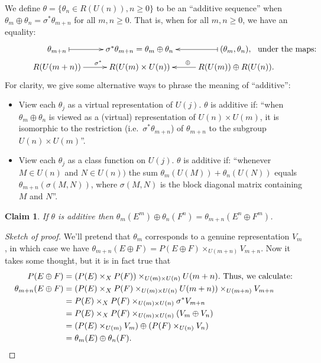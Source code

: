 \documentclass{article}
\newcommand{\from}{\leftarrow}
\newtheorem{claim}[thm]{Claim}
\begin{document}
We define $\theta = \{\theta_n \in R(U(n)), n \ge 0\}$ to be an ``additive sequence'' when $\theta_m \oplus \theta_n = \sigma^* \theta_{m+n}$ for all $m, n \ge 0$. That is, when for all $m,n\geq0$, we have an equality:
\[\xymatrix@R=2mm{
\theta_{m+n}\ar@{|->}[r]& \sigma^*\theta_{m+n}=\theta_m\oplus\theta_n&\ar@{|->}[l]
(\theta_m,\theta_n), \makebox[0mm][l]{\textup{ \ under the maps:} }\\
R(U(m+n)) \ar[r]^{\sigma^*}& R(U(m) \times U(n))&R(U(m))\oplus R(U(n))\ar[l]_\oplus .
}\]
For clarity, we give some alternative ways to phrase the meaning of ``additive'':
\begin{itemize}
\item View each $\theta_j$ as a virtual representation of $U(j)$. $\theta$ is additive if: ``when $\theta_m\oplus\theta_n$ is viewed as a (virtual) representation of $U(n)\times U(m)$, it is isomorphic to the restriction (i.e.\ $\sigma^*\theta_{m+n}$) of $\theta_{m+n}$ to the subgroup $U(n)\times U(m)$''.
\item View each $\theta_j$ as a class function on $U(j)$. $\theta$ is additive if: ``whenever $M\in U(n)$ and $N\in U(n))$ the sum $\theta_m(U(M))+\theta_n(U(N))$ equals $\theta_{m+n}(\sigma(M,N))$, where $\sigma(M,N)$ is the block diagonal matrix containing $M$ and $N$''.
\end{itemize}
\begin{claim}
If $\theta$ is additive then $\theta_m (E^m) \oplus \theta_n (F^n) = \theta_{m+n}(E^n \oplus F^m)$.
\end{claim}
\begin{proof}[Sketch of proof]
We'll pretend that $\theta_m$ corresponds to a genuine representation $V_m$, in which case we have $\theta_{m+n}(E \oplus F) = P(E \oplus F) \times_{U(m+n)} V_{m+n}$.  Now it takes some thought, but it is in fact true that
\begin{align*}
P(E \oplus F) & = (P(E) \times_X P(F)) \times_{U(m) \times U(n)} U(m + n). \text{ Thus, we calculate:}\\
\theta_{m+n}(E \oplus F) & = (P(E) \times_X P(F) \times_{U(m) \times U(n)} U(m+n)) \times_{U(m+n)} V_{m+n} \\
& = P(E) \times_X P(F) \times_{U(m) \times U(n)} \sigma^* V_{m+n} \\
& = P(E) \times_X P(F) \times_{U(m) \times U(n)} (V_m \oplus V_n) \\
& = (P(E) \times_{U(m)} V_m) \oplus (P(F) \times_{U(n)} V_n) \\
& = \theta_m (E) \oplus \theta_n (F).\qedhere
\end{align*}
\end{proof}
\end{document}
